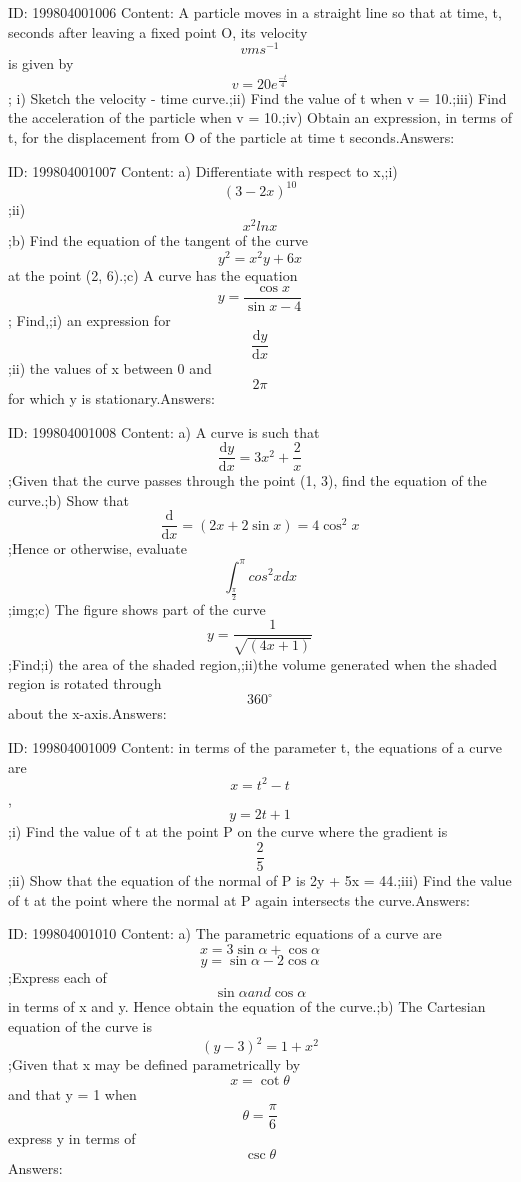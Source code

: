 \documentclass{article}
\begin{document}
ID: 199804001006
Content:
A particle moves in a straight line so that at time, t, seconds after leaving a fixed point O, its velocity \[vms^{-1}\] is given by \[v=20e^{\frac{-t}{4}}\]; i) Sketch the velocity - time curve.;ii) Find the value of t when v = 10.;iii) Find the acceleration of the particle when v = 10.;iv) Obtain an expression, in terms of t, for the displacement from O of the particle at time t seconds.Answers:

ID: 199804001007
Content:
a) Differentiate with respect to x,;i) \[(3-2x)^{10}\];ii) \[x^2lnx\];b) Find the equation of the tangent of the curve  \[y^2=x^2y+6x\]  at the point (2, 6).;c) A curve has the equation \[y=\frac{\cos x}{\sin x-4}\]; Find,;i) an expression for \[\frac{\mathrm{d} y}{\mathrm{d} x}\];ii) the values of x between 0 and \[2\pi\] for which y is stationary.Answers:

ID: 199804001008
Content:
a) A curve is such that \[\frac{\mathrm{d} y}{\mathrm{d} x}=3x^2+\frac{2}{x}\];Given that the curve passes through the point (1, 3), find the equation of the curve.;b) Show that \[\frac{\mathrm{d} }{\mathrm{d} x}=(2x+2\sin x)=4\cos^2x\];Hence or otherwise, evaluate \[\int_\frac{\pi}{2}^\pi cos^2xdx\];img;c) The figure shows part of the curve \[y=\frac{1}{\sqrt{(4x+1)}}\];Find;i) the area of the shaded region,;ii)the volume generated when the shaded region is rotated through \[360^{\circ}\]   about the x-axis.Answers:

ID: 199804001009
Content:
in terms of the parameter t, the equations of a curve are \[x=t^2-t\], \[y=2t+1\];i) Find the value of t at the point P on the curve where the gradient is \[\frac{2}{5}\];ii) Show that the equation of the normal of P is 2y + 5x = 44.;iii) Find the value of t at the point where the normal at P again intersects the curve.Answers:

ID: 199804001010
Content:
a) The parametric equations of a curve are \[x=3\sin\alpha+\cos\alpha\] \[y=\sin\alpha-2\cos\alpha\];Express each of \[\sin\alpha and \cos\alpha\] in terms of x and y. Hence obtain the equation of the curve.;b) The Cartesian equation of the curve is \[(y-3)^2=1+x^2\];Given that x may be defined parametrically by \[x=\cot \theta \]and that y = 1 when \[\theta=\frac{\pi }{6}\] express y in terms of \[\csc \theta\]Answers:
\end{document}
